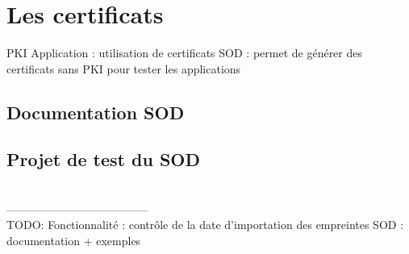 \section{Les certificats}

PKI
Application : utilisation de certificats
SOD : permet de générer des certificats sans PKI pour tester les applications


\subsection{Documentation SOD}


\subsection{Projet de test du SOD}



~~\\--------------------------------------~~\\
TODO:
Fonctionnalité : contrôle de la date d'importation des empreintes
SOD : documentation + exemples